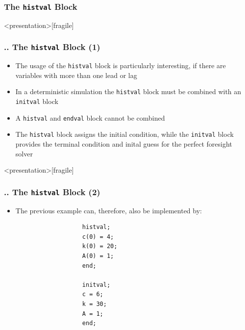 \documentclass[11pt,aspectratio=169]{beamer}
\begin{document}
\subsubsection{The \texttt{histval} Block}
\begin{frame}<presentation>[fragile]
	\frametitle{{\thesection.\thesubsection.\thesubsubsection} The \texttt{histval} Block (1)}
	\begin{itemize}
		\item The usage of the \texttt{histval} block is particularly interesting, if there are variables with more than one lead or lag 
		\item In a deterministic simulation the \texttt{histval} block must be combined with an \texttt{initval} block 
		\item A \texttt{histval} and \texttt{endval} block cannot be combined
		\item The \texttt{histval} block assigns the initial condition, while the \texttt{initval} block provides the terminal condition and inital guess for the perfect foresight solver
	\end{itemize}
\end{frame}
\begin{frame}<presentation>[fragile]
	\frametitle{{\thesection.\thesubsection.\thesubsubsection} The \texttt{histval} Block (2)}
	\begin{itemize}
		\item The previous example can, therefore, also be implemented by:
			\begin{verbatim}
				   histval;
				   c(0) = 4;
				   k(0) = 20;
				   A(0) = 1;
				   end;
				
				   initval;
				   c = 6;
				   k = 30;
				   A = 1;
				   end;
			\end{verbatim}
	\end{itemize}
\end{frame}
\end{document}
